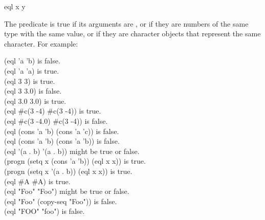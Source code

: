 \begin{defun}[Function]
eql x y

The  predicate is true if its arguments are ,
or if they are numbers of the same type with the same value,
or if they are character objects
that represent the same character.
For example:
\begin{lisp}
(eql 'a 'b) \textrm{is false.} \\
(eql 'a 'a) \textrm{is true.} \\
(eql 3 3) \textrm{is true.} \\
(eql 3 3.0) \textrm{is false.} \\
(eql 3.0 3.0) \textrm{is true.} \\
(eql \#c(3 -4) \#c(3 -4)) \textrm{is true.} \\
(eql \#c(3 -4.0) \#c(3 -4)) \textrm{is false.} \\
(eql (cons 'a 'b) (cons 'a 'c)) \textrm{is false.} \\
(eql (cons 'a 'b) (cons 'a 'b)) \textrm{is false.} \\
(eql '(a . b) '(a . b)) \textrm{might be true or false.} \\
(progn (setq x (cons 'a 'b)) (eql x x)) \textrm{is true.} \\
(progn (setq x '(a . b)) (eql x x)) \textrm{is true.} \\
(eql \#{\Xbackslash}A \#{\Xbackslash}A) \textrm{is true.} \\
(eql "Foo" "Foo") \textrm{might be true or false.} \\
(eql "Foo" (copy-seq "Foo")) \textrm{is false.} \\
(eql "FOO" "foo") \textrm{is false.}
\end{lisp}


\end{defun}
